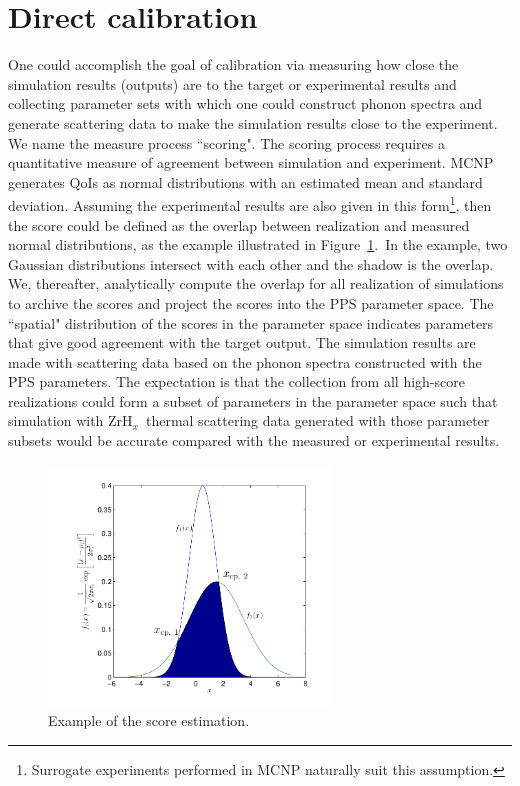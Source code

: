\documentclass[review]{elsarticle}
\newcommand{\zh}{ZrH$_x$}
\begin{document}
\section{Direct calibration}
One could accomplish the goal of calibration via measuring how close the simulation results (outputs) are to the target or experimental results and collecting parameter sets with which one could construct phonon spectra and generate scattering data to make the simulation results close to the experiment. We name the measure process ``scoring". {The scoring process requires a quantitative measure of agreement between simulation and experiment. MCNP generates QoIs as normal distributions with an estimated mean and standard deviation. Assuming the experimental results are also given in this form\footnote{Surrogate experiments performed in MCNP naturally suit this assumption.}, then the score could be defined as the overlap between realization and measured normal distributions, as the example illustrated in Figure~\ref{fg:score}.~In the example, two Gaussian distributions intersect with each other and the shadow  is the overlap. We, thereafter, analytically compute the overlap for all realization of simulations to archive the scores and project the scores into the PPS parameter space. The ``spatial" distribution of the scores in the parameter space indicates parameters that give good agreement with the target output. The simulation results are made with scattering data based on the phonon spectra constructed with the PPS parameters.} The expectation is that the collection from all high-score realizations could form a subset of parameters in the parameter space such that simulation with \zh~thermal scattering data generated with those parameter subsets would be accurate compared with the measured or experimental results.

\begin{figure}[ht!]
  \begin{center}
    \includegraphics[width=0.67\textwidth]{NSE15-48R1_Figure5.pdf}
    \caption[]{\label{fg:score}Example of the score estimation.}%
  \end{center}
\end{figure}
\end{document}
